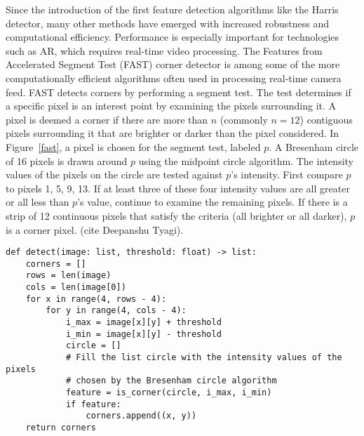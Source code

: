 Since the introduction of the first feature detection algorithms like the Harris detector, many other methods have emerged with increased robustness and computational efficiency. Performance is especially important for technologies such as AR, which requires real-time video processing. The Features from Accelerated Segment Test (FAST) corner detector is among some of the more computationally efficient algorithms often used in processing real-time camera feed. FAST detects corners by performing a segment test. The test determines if a specific pixel is an interest point by examining the pixels surrounding it. A pixel is deemed a corner if there are more than $n$ (commonly $n = 12$) contiguous pixels surrounding it that are brighter or darker than the pixel considered. In Figure~\ref{fast}, a pixel is chosen for the segment test, labeled $p$. A Bresenham circle of 16 pixels is drawn around $p$ using the midpoint circle algorithm. The intensity values of the pixels on the circle are tested against $p$'s intensity. First compare $p$ to pixels 1, 5, 9, 13.  If at least three of these four intensity values are all greater or all less than $p$'s value, continue to examine the remaining pixels. If there is a strip of 12 continuous pixels that satisfy the criteria (all brighter or all darker), $p$ is a corner pixel. (cite Deepanshu Tyagi).

\begin{figure}[!ht]
\end{figure}

\begin{lstlisting}[mathescape, caption= Check for corner at pixel with given Bresenham circle, label=detect]
def detect(image: list, threshold: float) -> list:
    corners = []
    rows = len(image)
    cols = len(image[0])
    for x in range(4, rows - 4):
        for y in range(4, cols - 4):
            i_max = image[x][y] + threshold
            i_min = image[x][y] - threshold
            circle = []
            # Fill the list circle with the intensity values of the pixels
            # chosen by the Bresenham circle algorithm
            feature = is_corner(circle, i_max, i_min)
            if feature:
                corners.append((x, y))
    return corners
\end{lstlisting}


